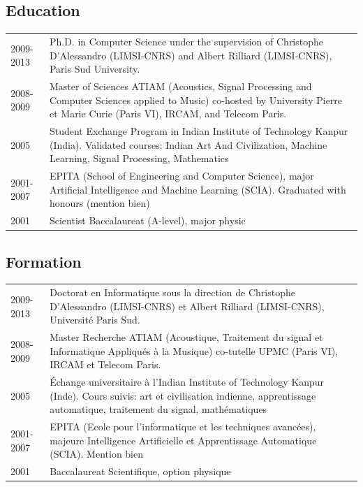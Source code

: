 \begin{en}
\section{Education}
\begin{tabularx}{\linewidth}{@{}l X@{}}	
2009-2013 & Ph.D. in Computer Science under the supervision of Christophe D’Alessandro (LIMSI-CNRS) and Albert Rilliard (LIMSI-CNRS), Paris Sud University.\\
2008-2009 & Master of Sciences ATIAM (Acoustics, Signal Processing and Computer Sciences applied to Music) co-hosted by University Pierre et Marie Curie (Paris VI), IRCAM, and Telecom Paris.\\
2005 & Student Exchange Program in Indian Institute of Technology Kanpur (India). Validated courses: Indian Art And Civilization, Machine Learning, Signal Processing, Mathematics\\
2001-2007 & EPITA (School of Engineering and Computer Science), major Artificial Intelligence and Machine Learning (SCIA). Graduated with honours (mention bien)\\
2001 & Scientist Baccalaureat (A-level), major physic\\
\end{tabularx}
\end{en}


\begin{fr}
\section{Formation}
\begin{tabularx}{\linewidth}{@{}l X@{}}	
2009-2013 & Doctorat en Informatique sous la direction de Christophe D’Alessandro (LIMSI-CNRS) et Albert Rilliard (LIMSI-CNRS), Université Paris Sud.\\
2008-2009 & Master Recherche ATIAM (Acoustique, Traitement du signal et Informatique Appliqués à la Musique) co-tutelle UPMC (Paris VI), IRCAM et Telecom Paris.\\
2005 & \'Echange universitaire à l'Indian Institute of Technology Kanpur (Inde). Cours suivis: art et civilisation indienne, apprentissage automatique, traitement du signal, mathématiques\\
2001-2007 & EPITA (Ecole pour l'informatique et les techniques avancées), majeure Intelligence Artificielle et Apprentissage Automatique (SCIA). Mention bien\\
2001 & Baccalaureat Scientifique, option physique\\
\end{tabularx}
\end{fr}


